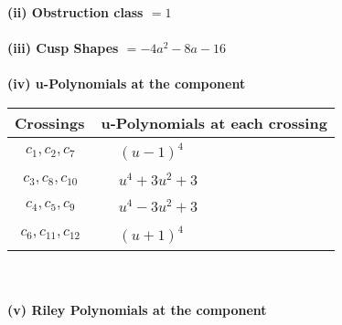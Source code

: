 \documentclass[1p]{elsarticle_modified}
\theoremstyle{definition}
\begin{document}
\flushleft \textbf{(ii) Obstruction class $= 1$}\\~\\
\flushleft \textbf{(iii) Cusp Shapes $= -4 a^2-8 a-16$}\\~\\
\newpage\renewcommand{\arraystretch}{1}
\flushleft \textbf{(iv) u-Polynomials at the component}\newline \\
\begin{tabular}{m{50pt}|m{274pt}}
Crossings & \hspace{64pt}u-Polynomials at each crossing \\
\hline $$\begin{aligned}c_{1},c_{2},c_{7}\end{aligned}$$&$\begin{aligned}
&(u-1)^4
\end{aligned}$\\
\hline $$\begin{aligned}c_{3},c_{8},c_{10}\end{aligned}$$&$\begin{aligned}
&u^4+3 u^2+3
\end{aligned}$\\
\hline $$\begin{aligned}c_{4},c_{5},c_{9}\end{aligned}$$&$\begin{aligned}
&u^4-3 u^2+3
\end{aligned}$\\
\hline $$\begin{aligned}c_{6},c_{11},c_{12}\end{aligned}$$&$\begin{aligned}
&(u+1)^4
\end{aligned}$\\
\hline
\end{tabular}\\~\\
\newpage\renewcommand{\arraystretch}{1}
\flushleft \textbf{(v) Riley Polynomials at the component}\newline \\
\end{document}
